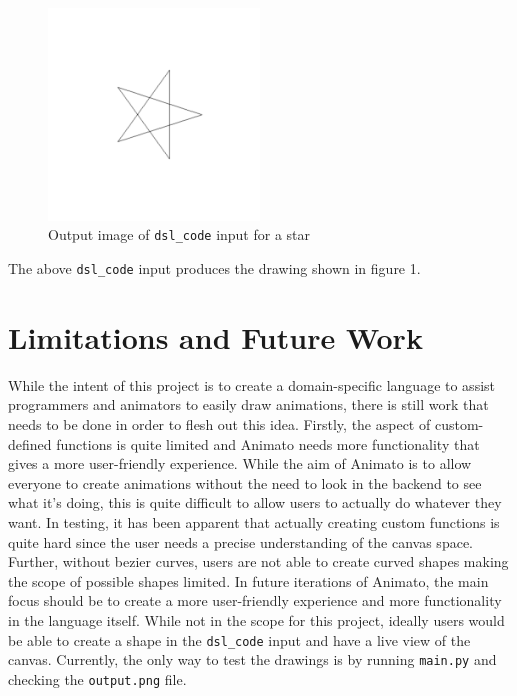 \documentclass[acmsmall,screen]{acmart}
\begin{document}
\begin{center}
  \begin{figure}[!h]
    \includegraphics[width=0.5\textwidth]{images/star.png}
    \caption{Output image of \texttt{dsl\_code} input for a star}
  \end{figure}
\end{center}

The above \texttt{dsl\_code} input produces the drawing shown in figure 1.

\section{Limitations and Future Work}
While the intent of this project is to create a domain-specific language to assist programmers and animators to easily draw animations, there is still work that needs to be done in order to flesh out this idea.
Firstly, the aspect of custom-defined functions is quite limited and Animato needs more functionality that gives a more user-friendly experience.
While the aim of Animato is to allow everyone to create animations without the need to look in the backend to see what it's doing, this is quite difficult to allow users to actually do whatever they want.
In testing, it has been apparent that actually creating custom functions is quite hard since the user needs a precise understanding of the canvas space.
Further, without bezier curves, users are not able to create curved shapes making the scope of possible shapes limited.
In future iterations of Animato, the main focus should be to create a more user-friendly experience and more functionality in the language itself.
While not in the scope for this project, ideally users would be able to create a shape in the \texttt{dsl\_code} input and have a live view of the canvas.
Currently, the only way to test the drawings is by running \texttt{main.py} and checking the \texttt{output.png} file. 
\end{document}
